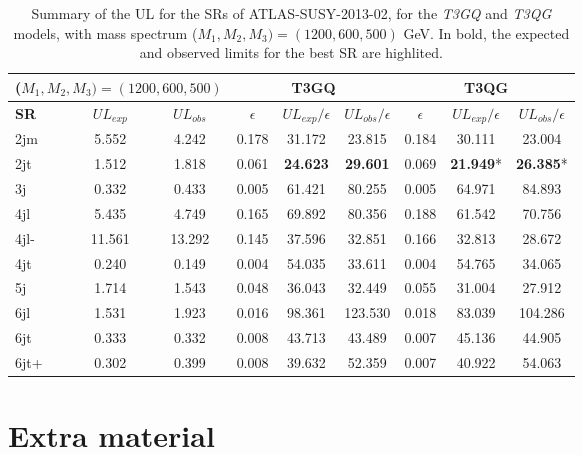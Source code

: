 \documentclass[preprint,number,sort&compress,twocolumn,3p]{elsstyarticle}
\begin{document}
\begin{table}[h]
	\centering
	\renewcommand\arraystretch{1.3} 
	\scriptsize
	\begin{tabular}{ l c c    c c c  |  c c c  }
		\toprule \toprule
		\multicolumn{3}{c}{($M_1,M_2,M_3) = (1200,600,500)$} & \multicolumn{3}{c}{ \textbf{T3GQ}} & \multicolumn{3}{c}{ \textbf{T3QG}} \\  \toprule 
		\textbf{SR} & $UL_{exp}$ & $UL_{obs}$ & $\epsilon$ &  $UL_{exp}/\epsilon$ & $UL_{obs}/\epsilon$ & $\epsilon$ & $UL_{exp}/ \epsilon$ & $UL_{obs}/ \epsilon$ \\
		2jm & 5.552 &  4.242 &  0.178	 &31.172 &	23.815		 &0.184	 &30.111	 &23.004 \\
		2jt  & 1.512  & 1.818 &  0.061& 	\textbf{24.623}	& \textbf{29.601}	& 	0.069	& \textbf{21.949}*& 	\textbf{26.385}* \\
		3j &  0.332 &  0.433  & 0.005& 	61.421& 	80.255		& 0.005	& 64.971& 	84.893 \\ 
		4jl  & 5.435 &  4.749  & 0.165	& 69.892	& 80.356	& 	0.188	& 61.542& 	70.756  \\
		4jl-  & 11.561 &  13.292 &  0.145	& 37.596	& 32.851		& 0.166	& 32.813	& 28.672 \\
		4jt  & 0.240  & 0.149  & 0.004& 	54.035	& 33.611		& 0.004	& 54.765& 	34.065  \\
		5j  & 1.714  & 1.543  &0.048	& 36.043	& 32.449	& 	0.055	& 31.004	& 27.912  \\
		6jl  & 1.531  & 1.923  & 0.016	& 98.361	& 123.530	& 	0.018	& 83.039	& 104.286 \\
		6jt &  0.333  & 0.332 &  0.008	& 43.713& 	43.489	& 	0.007	& 45.136	& 44.905  \\
		6jt+  & 0.302 &  0.399 & 0.008& 	39.632& 	52.359	& 	0.007	& 40.922	& 54.063 \\
		\bottomrule \bottomrule
	\end{tabular}
	\caption{Summary of the UL for the SRs of ATLAS-SUSY-2013-02, for the \textit{T3GQ} and \textit{T3QG} models, with mass spectrum ($M_1,M_2,M_3) = (1200,600,500)$ GeV. In bold, the expected and observed limits for the best SR are highlited.}
	\label{ATLAS02_UL_2}
\end{table}
\section{Extra material}
\end{document}
